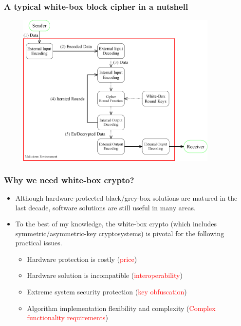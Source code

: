 \documentclass{beamer}
\begin{document}
\frame
{
\frametitle{A typical white-box block cipher in a nutshell}
\begin{figure}[htbp]
\centering
  \includegraphics[width=10cm]{./pics/WBCrypto_Functional_Model.png}

\end{figure}

}


\frame
{
\frametitle{Why we need white-box crypto?}
\begin{itemize}
\setlength{\itemsep}{12pt}
\item Although hardware-protected black/grey-box solutions are matured in the last decade, software solutions are still useful in many areas.

\item To the best of my knowledge, the white-box crypto (which includes symmetric/asymmetric-key cryptosystems) is pivotal for the following practical issues.
\begin{itemize}
\setlength{\itemsep}{12pt}
\item Hardware protection is costly (\textcolor{red}{price})
\item Hardware solution is incompatible (\textcolor{red}{interoperability})
\item Extreme system security protection (\textcolor{red}{key obfuscation})
\item Algorithm implementation flexibility and complexity (\textcolor{red}{Complex functionality requirements})
\end{itemize}
\end{itemize}

}
\end{document}

